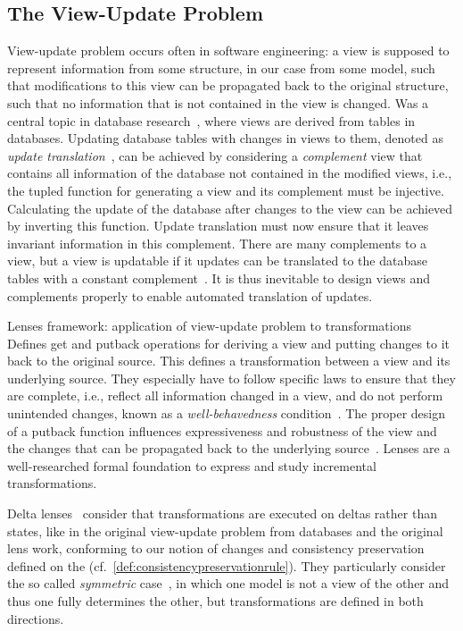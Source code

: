 \subsection{The View-Update Problem}

View-update problem occurs often in software engineering: a view is supposed to represent information from some structure, in our case from some model, such that modifications to this view can be propagated back to the original structure, such that no information that is not contained in the view is changed.
Was a central topic in database research~\cite{bancilhon1981viewUpdate-TDS, dayal1982viewUpdate-TDS}, where views are derived from tables in databases.
Updating database tables with changes in views to them, denoted as \emph{update translation}~\cite{bancilhon1981viewUpdate-TDS}, can be achieved by considering a \emph{complement} view that contains all information of the database not contained in the modified views, i.e., the tupled function for generating a view and its complement must be injective.
Calculating the update of the database after changes to the view can be achieved by inverting this function.
Update translation must now ensure that it leaves invariant information in this complement.
There are many complements to a view, but a view is updatable if it updates can be translated to the database tables with a constant complement~\cite{bancilhon1981viewUpdate-TDS}.
It is thus inevitable to design views and complements properly to enable automated translation of updates.

Lenses framework: application of view-update problem to transformations~\cite{foster2005Combinators-POPL, foster2007combinators-TPLS}
Defines get and putback operations for deriving a view and putting changes to it back to the original source.
This defines a transformation between a view and its underlying source.
They especially have to follow specific laws to ensure that they are complete, i.e., reflect all information changed in a view, and do not perform unintended changes, known as a \emph{well-behavedness} condition~\cite[Def. 3.2]{foster2007combinators-TPLS}.
The proper design of a putback function influences expressiveness and robustness of the view and the changes that can be propagated back to the underlying source~\cite{foster2007combinators-TPLS}.
Lenses are a well-researched formal foundation to express and study incremental transformations.

Delta lenses~\cite{diskin2011StateToDeltaSymmetric-MODELS} consider that transformations are executed on deltas rather than states, like in the original view-update problem from databases and the original lens work, conforming to our notion of changes and consistency preservation defined on the (cf.\ \autoref{def:consistencypreservationrule}).
They particularly consider the so called \emph{symmetric} case~\cite{diskin2011StateToDeltaSymmetric-MODELS}, in which one model is not a view of the other and thus one fully determines the other, but transformations are defined in both directions.

